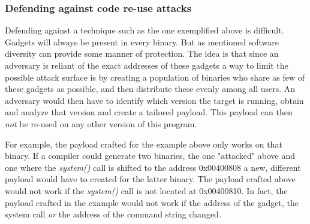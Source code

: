 \subsubsection{Defending against code re-use attacks}

Defending against a technique such as the one exemplified above is difficult. Gadgets will
always be present in every binary. But as mentioned software diversity can provide some
manner of protection. The idea is that since an adversary is reliant of the exact
addresses of these gadgets a way to limit the possible attack surface is by creating a
population of binaries who share as few of these gadgets as possible, and then distribute
these evenly among all users. An adversary would then have to identify which version the
target is running, obtain and analyze that version and create a tailored payload. This
payload can then \textit{not} be re-used on any other version of this program.

For example, the payload crafted for the example above only works on that binary. If a
compiler could generate two binaries, the one "attacked" above and one where the
\textit{system()} call is shifted to the address 0x00400808 a new, different payload would
have to created for the latter binary. The payload crafted above would not work if the
\textit{system()} call is not located at 0x00400810. In fact, the payload crafted in the
example would not work if the address of the gadget, the system call \textit{or} the
address of the command string changed.
